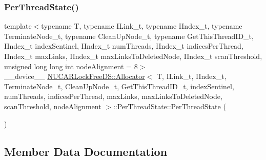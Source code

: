 \subsubsection{\texorpdfstring{Per\+Thread\+State()}{PerThreadState()}}
{\footnotesize\ttfamily template$<$typename T, typename I\+Link\+\_\+t, typename I\+Index\+\_\+t, typename Terminate\+Node\+\_\+t, typename Clean\+Up\+Node\+\_\+t, typename Get\+This\+Thread\+I\+D\+\_\+t, I\+Index\+\_\+t index\+Sentinel, I\+Index\+\_\+t num\+Threads, I\+Index\+\_\+t indices\+Per\+Thread, I\+Index\+\_\+t max\+Links, I\+Index\+\_\+t max\+Links\+To\+Deleted\+Node, I\+Index\+\_\+t scan\+Threshold, unsigned long long int node\+Alignment = 8$>$ \\
\+\_\+\+\_\+device\+\_\+\+\_\+ \mbox{\hyperlink{class_n_u_c_a_r_lock_free_d_s_1_1_allocator}{N\+U\+C\+A\+R\+Lock\+Free\+D\+S\+::\+Allocator}}$<$ T, I\+Link\+\_\+t, I\+Index\+\_\+t, Terminate\+Node\+\_\+t, Clean\+Up\+Node\+\_\+t, Get\+This\+Thread\+I\+D\+\_\+t, index\+Sentinel, num\+Threads, indices\+Per\+Thread, max\+Links, max\+Links\+To\+Deleted\+Node, scan\+Threshold, node\+Alignment $>$\+::Per\+Thread\+State\+::\+Per\+Thread\+State (\begin{DoxyParamCaption}{ }\end{DoxyParamCaption})\hspace{0.3cm}{\ttfamily [inline]}}



\subsection{Member Data Documentation}
\mbox{\label{class_n_u_c_a_r_lock_free_d_s_1_1_allocator_1_1_per_thread_state_add29cc3216c93c4dbc5287dd5c296f07}} 
